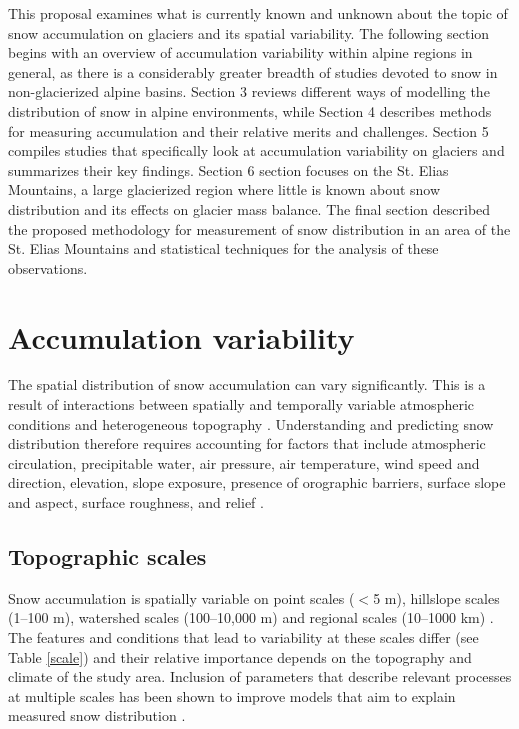 \documentclass{sfuthesis}
\begin{document}
This proposal examines what is currently known and unknown about the topic of snow accumulation on glaciers and its spatial variability. The following section begins with an overview of accumulation variability within alpine regions in general, as there is a considerably greater breadth of studies devoted to snow in non-glacierized alpine basins. Section 3 reviews different ways of modelling the distribution of snow in alpine environments, while Section 4 describes methods for measuring accumulation and their relative merits and challenges. Section 5 compiles studies that specifically look at accumulation variability on glaciers and summarizes their key findings. Section 6 section focuses on the St. Elias Mountains, a large glacierized region where little is known about snow distribution and its effects on glacier mass balance. The final section described the proposed methodology for measurement of snow distribution in an area of the St. Elias Mountains and statistical techniques for the analysis of these observations. 

\section{Accumulation variability}

The spatial distribution of snow accumulation can vary significantly. This is a result of interactions between spatially and temporally variable atmospheric conditions and heterogeneous topography \citep{Deems2006, Liston2006}. Understanding and predicting snow distribution therefore requires accounting for factors that include atmospheric circulation, precipitable water, air pressure, air temperature, wind speed and direction, elevation, slope exposure, presence of orographic barriers, surface slope and aspect, surface roughness, and relief \citep{Schweizer2008a,McGrath2015}.

\subsection{Topographic scales}
Snow accumulation is spatially variable on point scales ($<$5 m), hillslope scales (1--100 m), watershed scales (100--10,000 m) and regional scales (10--1000 km) \citep{Clark2011}. The features and conditions that lead to variability at these scales differ (see Table \ref{scale}) and their relative importance depends on the topography and climate of the study area. Inclusion of parameters that describe relevant processes at multiple scales has been shown to improve models that aim to explain measured snow distribution \citep{Marchand2005, Clark2011}. 
\end{document}
